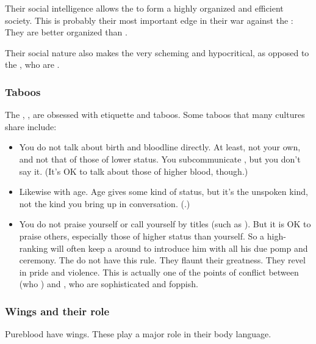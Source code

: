 Their social intelligence allows the \resphain{} to form a highly organized and efficient society. 
This is probably their most important edge in their war against the \dragons: 
They are better organized than . 

Their social nature also makes the \resphain{} very scheming and hypocritical, as opposed to the \dragons, who are . 





\subsubsection{Taboos}
The \resphain, , are obsessed with etiquette and taboos. 
Some taboos that many \resphan{} cultures share include: 
\begin{itemize}
  \item 
    You do not talk about birth and bloodline directly. 
    At least, not your own, and not that of those of lower status. 
    You subcommunicate \quo{\ashenblood}, but you don't say it. 
    (It's OK to talk about those of higher blood, though.)
  \item 
    Likewise with age. 
    Age gives some kind of status, but it's the unspoken kind, not the kind you bring up in conversation. 
    (.)
  \item 
    You do not praise yourself or call yourself by titles (such as ). 
    But it is OK to praise others, especially those of higher status than yourself. 
    So a high-ranking \resphan{} will often keep a  around to introduce him with all his due pomp and ceremony. 
    \subitem
      The \Mystraacht{} do not have this rule. 
      They flaunt their greatness. 
      They revel in pride and violence. 
      This is actually one of the points of conflict between \Mystraacht{} (who ) and \KiriathSepher, who are sophisticated and foppish. 
\end{itemize}





\subsubsection{Wings and their role}
Pureblood \resphain{} have wings. 
These play a major role in their body language. 

